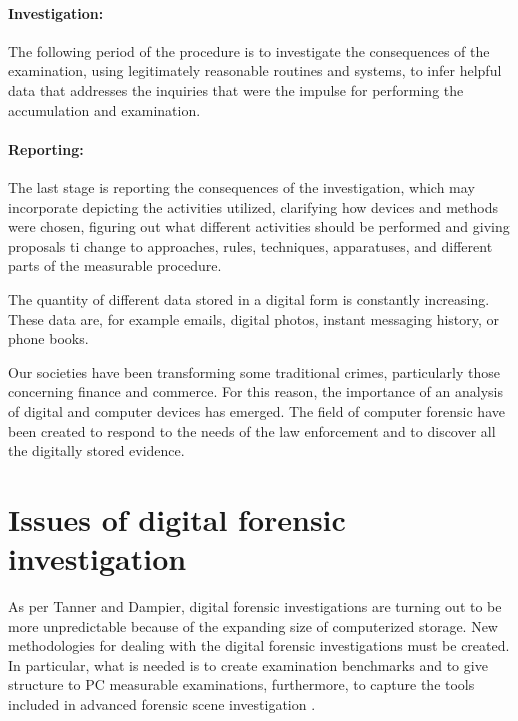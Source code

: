 \paragraph{Investigation:}
The following period of the procedure is to investigate the consequences of the examination, using legitimately reasonable routines and systems, to infer helpful data that addresses the inquiries that were the impulse for performing the accumulation and examination. 


\paragraph{Reporting:}
The last stage is reporting the consequences of the investigation, which may incorporate depicting the activities utilized, clarifying how devices and methods were chosen, figuring out what different activities should be performed and giving proposals ti change to approaches, rules, techniques, apparatuses, and different parts of the measurable procedure. 



The quantity of different data stored in a digital form is constantly increasing. These data are, for example emails, digital photos, instant messaging history, or phone books.

Our societies have been transforming some traditional crimes, particularly those concerning finance and commerce. For this reason, the importance of an analysis of digital and computer devices has emerged. The field of computer forensic have been created to respond to the needs of the law enforcement and to discover all the digitally stored evidence.

\section{Issues of digital forensic investigation}
As per Tanner and Dampier, digital forensic investigations are turning out to be more unpredictable because of the expanding size of computerized storage. New methodologies for dealing with the digital forensic investigations must be created. In particular, what is needed is to create examination benchmarks and to give structure to PC measurable examinations, furthermore, to capture the tools included in advanced forensic scene investigation \cite{5}.



